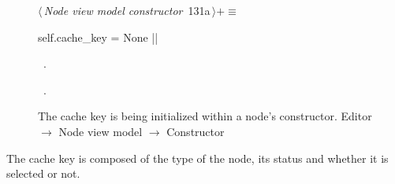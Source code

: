 \documentclass[%
    a4paper,    %
    justified,  %
    nobib,      %
    openany     %
]{tufte-book}
\makeatletter
\renewcommand{\label}[1]{\@tufte@label{##1}}%
\makeatother
\begin{document}
\begin{figure}[!htbp]
\begin{flushleft} \small
\begin{minipage}{\linewidth}\label{scrap73}\raggedright\small
{} $\langle\,${\itshape Node view model constructor}\nobreak\ {\footnotesize {131a}}$\,\rangle+\equiv$
\vspace{-1ex}
\begin{pythoncode}
    self.cache_key = None
|\NWsep|
\end{pythoncode}
\vspace{1.5ex}
\footnotesize
\begin{list}{}{\setlength{\itemsep}{-\parsep}\setlength{\itemindent}{-\leftmargin}}
\item \NWtxtMacroDefBy\ .
\item \NWtxtMacroRefIn\ .

\item{}
\end{list}
\end{minipage}\vspace{4ex}
\end{flushleft}
\caption{The cache key is being initialized within a node's constructor.
  \newline{}\newline{}Editor $\rightarrow$ Node view model $\rightarrow$
  Constructor}
\end{figure}

The cache key is composed of the type of the node, its status and whether it is
selected or not.
\end{document}
